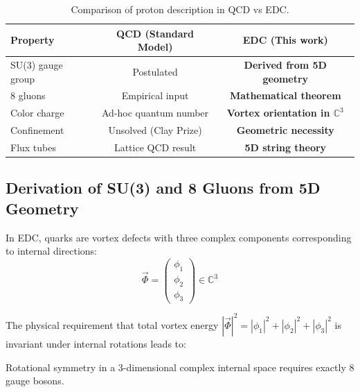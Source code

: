 \begin{table}[H]
\centering
\begin{tabular}{lcc}
\toprule
\textbf{Property} & \textbf{QCD (Standard Model)} & \textbf{EDC (This work)} \\
\midrule
SU(3) gauge group & Postulated & \textbf{Derived from 5D geometry} \\
8 gluons & Empirical input & \textbf{Mathematical theorem} \\
Color charge & Ad-hoc quantum number & \textbf{Vortex orientation in $\mathbb{C}^3$} \\
Confinement & Unsolved (Clay Prize) & \textbf{Geometric necessity} \\
Flux tubes & Lattice QCD result & \textbf{5D string theory} \\
\bottomrule
\end{tabular}
\caption{Comparison of proton description in QCD vs EDC.}
\label{tab:ch2_qcd_vs_edc}
\end{table}

\subsection{Derivation of SU(3) and 8 Gluons from 5D Geometry}

In EDC, quarks are vortex defects with three complex components corresponding to
internal directions:
\begin{equation}
\vec{\Phi} = \begin{pmatrix} \phi_1 \\ \phi_2 \\ \phi_3 \end{pmatrix} \in \mathbb{C}^3
\label{eq:ch2_quark_field}
\end{equation}

The physical requirement that total vortex energy $|\vec{\Phi}|^2 = |\phi_1|^2 + |\phi_2|^2 + |\phi_3|^2$
is invariant under internal rotations leads to:

\begin{theorem}
\label{thm:ch2_8gluons}
\tagM{}
Rotational symmetry in a 3-dimensional complex internal space requires exactly 8 gauge bosons.
\end{theorem}

